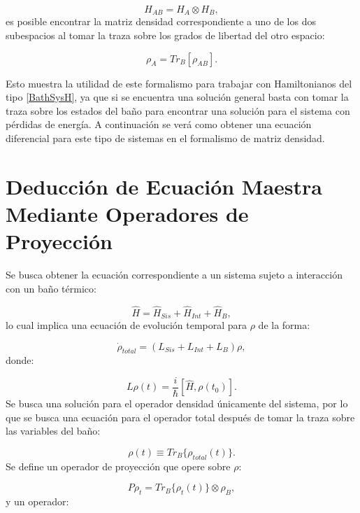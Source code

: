 \documentclass[a4paper,10pt]{report}
\begin{document}
\begin{equation}
H_{AB} = H_A \otimes H_B,
\end{equation} es posible encontrar la matriz densidad correspondiente a uno de los dos subespacios al tomar la traza sobre los grados de libertad del otro espacio:

\begin{equation}
\rho_A = Tr_B [\rho_{AB}].
\end{equation}

Esto muestra la utilidad de este formalismo para trabajar con Hamiltonianos del tipo \ref{BathSysH}, ya que si se encuentra una solución general basta con tomar la traza sobre los estados del baño para encontrar una solución para el sistema con pérdidas de energía. A continuación se verá como obtener una ecuación diferencial para este tipo de sistemas en el formalismo de matriz densidad.

\section{Deducción de Ecuación Maestra Mediante Operadores de Proyección}

Se busca obtener la ecuación correspondiente a un sistema sujeto a interacción con un baño térmico:

\begin{equation}
\hat{H} = \hat{H}_{Sis}+\hat{H}_{Int}+\hat{H}_B,
\end{equation} lo cual implica una ecuación de evolución temporal para $\rho$ de la forma:

\begin{equation}\label{LMeq}
\dot{\rho}_{total} = (L_{Sis}+L_{Int}+L_B)\rho,
\end{equation}donde:

\begin{equation}\label{defL}
L\rho(t) = \frac{i}{\hbar}[\hat{H},\rho(t_0)].
\end{equation} Se busca una solución para el operador densidad únicamente del sistema, por lo que se busca una ecuación para el operador total después de tomar la traza sobre las variables del baño:

\begin{equation}
\rho(t) \equiv Tr_B\{\rho_{total}(t)\}.
\end{equation} Se define un operador de proyección \cite{ZollerQN} que opere sobre $ \rho $:

\begin{equation}
P\rho_t = Tr_B\{\rho_{t}(t)\}\otimes \rho_B,
\end{equation} y un operador:
\end{document}
